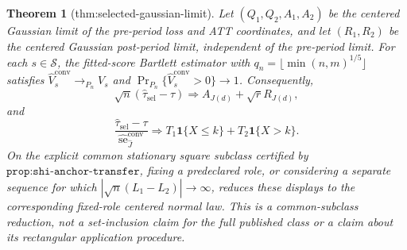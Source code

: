 \documentclass{article}
\newtheorem{theorem}{Theorem}
\begin{document}
\begin{theorem}[thm:selected-gaussian-limit]\label{thm:selected-gaussian-limit}
Let \((Q_1,Q_2,A_1,A_2)\) be the centered Gaussian limit of the pre-period loss and ATT coordinates, and let \((R_1,R_2)\) be the centered Gaussian post-period limit, independent of the pre-period limit.  For each \(s\in\mathcal S\), the fitted-score Bartlett estimator with \(q_n=\lfloor\min(n,m)^{1/5}\rfloor\) satisfies \(\widehat V_s^{\mathrm{conv}}\to_{P_n}V_s\) and \(\Pr_{P_n}\{\widehat V_s^{\mathrm{conv}}>0\}\to1\).  Consequently,
\[
 \sqrt n(\widehat\tau_{\mathrm{sel}}-\tau)
 \Rightarrow A_{J(d)}+\sqrt rR_{J(d)},
\]
and
\[
 \frac{\widehat\tau_{\mathrm{sel}}-\tau}
 {\widehat{\operatorname{se}}^{\mathrm{conv}}_{\widehat J}}
 \Rightarrow
 T_1\mathbf 1\{X\leq k\}+T_2\mathbf 1\{X>k\}.
\]
On the explicit common stationary square subclass certified by \(\texttt{prop:shi-anchor-transfer}\), fixing a predeclared role, or considering a separate sequence for which \(|\sqrt n(L_1-L_2)|\to\infty\), reduces these displays to the corresponding fixed-role centered normal law.  This is a common-subclass reduction, not a set-inclusion claim for the full published class or a claim about its rectangular application procedure.
\end{theorem}
\end{document}

